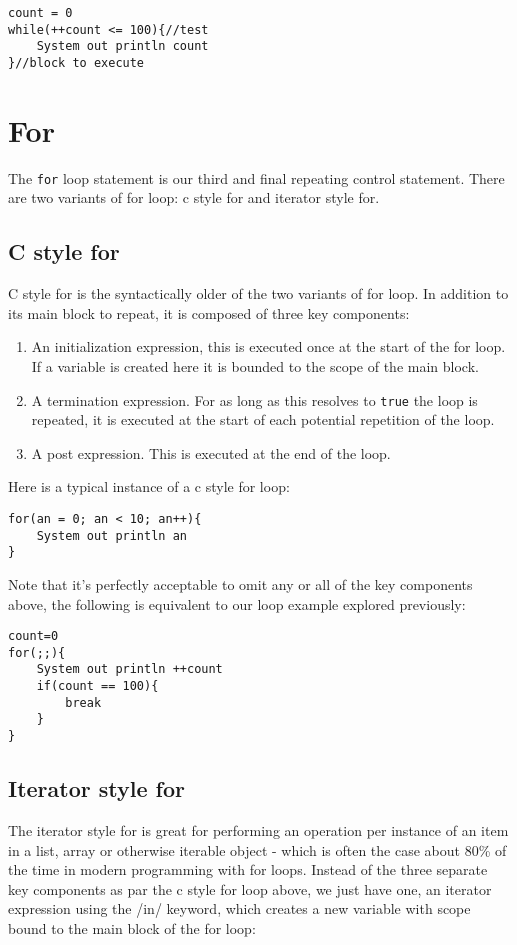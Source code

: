\documentclass[conc-doc]{subfiles}
\begin{document}
\begin{lstlisting}
count = 0
while(++count <= 100){//test
	System out println count
}//block to execute
\end{lstlisting}

\section{For}
The \lstinline{for} loop statement is our third and final repeating control statement. There are two variants of for loop: c style for and iterator style for.

\subsection{C style for}
\label{subsec:cstylefor}
C style for is the syntactically older of the two variants of for loop. In addition to its main block to repeat, it is composed of three key components:
\begin{enumerate}
	\item An initialization expression, this is executed once at the start of the for loop. If a variable is created here it is bounded to the scope of the main block.
	\item A termination expression. For as long as this resolves to \lstinline{true} the loop is repeated, it is executed at the start of each potential repetition of the loop.
	\item A post expression. This is executed at the end of the loop.
\end{enumerate}

Here is a typical instance of a c style for loop:
\begin{lstlisting}
for(an = 0; an < 10; an++){
	System out println an	
}
\end{lstlisting}

Note that it's perfectly acceptable to omit any or all of the key components above, the following is equivalent to our loop example explored previously:
\begin{lstlisting}
count=0
for(;;){
	System out println ++count
	if(count == 100){
		break
	}
}
\end{lstlisting}

\subsection{Iterator style for}
\label{subsec:IteratorStyleFor}
The iterator style for is great for performing an operation per instance of an item in a list, array or otherwise iterable object - which is often the case about 80\% of the time in modern programming with for loops. Instead of the three separate key components as par the c style for loop above, we just have one, an iterator expression using the /in/ keyword, which creates a new variable with scope bound to the main block of the for loop:
\end{document}
